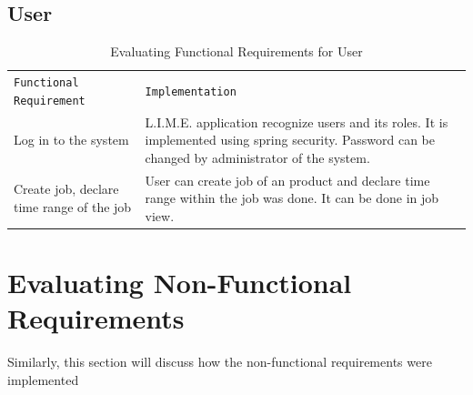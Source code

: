 \documentclass[a4paper,11pt,twoside]{report}
\theoremstyle{definition}
\begin{document}
\subsection{User}

\begin{longtable}{|p{4cm}|p{12cm}|}
\caption[Evaluating Functional Requirements for User]{Evaluating Functional Requirements for User}
\label{Evaluating Functional Requirements for User}
\centering
\tabularnewline

\hline
\texttt{Functional Requirement} & \texttt{Implementation} \\ \hline
Log in to the system & L.I.M.E. application recognize users and its roles. It is implemented using spring security. Password can be changed by administrator of the system. \\ \hline
Create job, declare time range of the job & User can create job of an product and declare time range within the job was done. It can be done in job view. \\ \hline


\end{longtable}

\section{Evaluating Non-Functional Requirements}

Similarly, this section will discuss how the non-functional requirements were implemented
\end{document}
